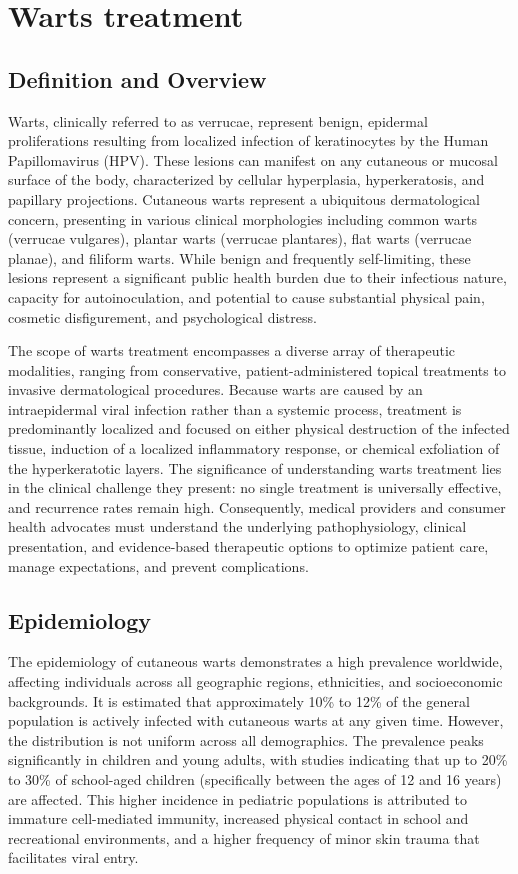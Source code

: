 \chapter{Warts treatment}

\section*{Definition and Overview}
Warts, clinically referred to as verrucae, represent benign, epidermal proliferations resulting from localized infection of keratinocytes by the Human Papillomavirus (HPV). These lesions can manifest on any cutaneous or mucosal surface of the body, characterized by cellular hyperplasia, hyperkeratosis, and papillary projections. Cutaneous warts represent a ubiquitous dermatological concern, presenting in various clinical morphologies including common warts (verrucae vulgares), plantar warts (verrucae plantares), flat warts (verrucae planae), and filiform warts. While benign and frequently self-limiting, these lesions represent a significant public health burden due to their infectious nature, capacity for autoinoculation, and potential to cause substantial physical pain, cosmetic disfigurement, and psychological distress.

The scope of warts treatment encompasses a diverse array of therapeutic modalities, ranging from conservative, patient-administered topical treatments to invasive dermatological procedures. Because warts are caused by an intraepidermal viral infection rather than a systemic process, treatment is predominantly localized and focused on either physical destruction of the infected tissue, induction of a localized inflammatory response, or chemical exfoliation of the hyperkeratotic layers. The significance of understanding warts treatment lies in the clinical challenge they present: no single treatment is universally effective, and recurrence rates remain high. Consequently, medical providers and consumer health advocates must understand the underlying pathophysiology, clinical presentation, and evidence-based therapeutic options to optimize patient care, manage expectations, and prevent complications.

\section*{Epidemiology}
The epidemiology of cutaneous warts demonstrates a high prevalence worldwide, affecting individuals across all geographic regions, ethnicities, and socioeconomic backgrounds. It is estimated that approximately 10\% to 12\% of the general population is actively infected with cutaneous warts at any given time. However, the distribution is not uniform across all demographics. The prevalence peaks significantly in children and young adults, with studies indicating that up to 20\% to 30\% of school-aged children (specifically between the ages of 12 and 16 years) are affected. This higher incidence in pediatric populations is attributed to immature cell-mediated immunity, increased physical contact in school and recreational environments, and a higher frequency of minor skin trauma that facilitates viral entry.

